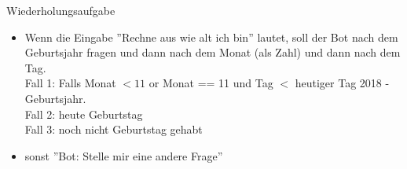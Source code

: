 \begin{frame}[fragile]{Wiederholungsaufgabe}

\begin{itemize}
	\item Wenn die Eingabe ''Rechne aus wie alt ich bin'' lautet, soll der Bot nach dem Geburtsjahr fragen und dann nach dem Monat (als Zahl) und dann nach dem Tag. \\Fall 1: Falls Monat $<11$ or Monat == 11 und Tag $<$ heutiger Tag 2018 - Geburtsjahr. \\
	Fall 2: heute Geburtstag\\
	Fall 3: noch nicht Geburtstag gehabt
	\item sonst ''Bot: Stelle mir eine andere Frage'' 
	\end{itemize}
\end{frame}
